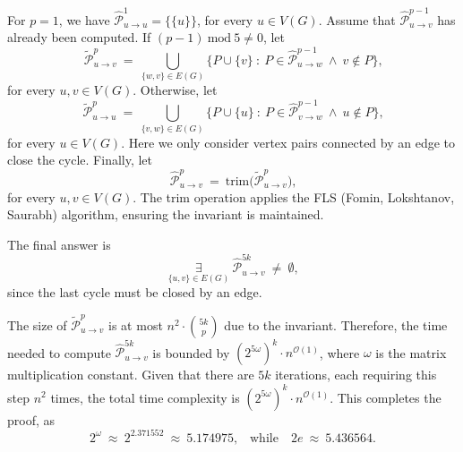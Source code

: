 \documentclass[12pt]{article}
\begin{document}
	For \(p = 1\), we have \(\widehat{\mathcal{P}}_{u \to u}^{1} = \{\{u\}\}\),
	for every \(u \in V(G)\). Assume that
	\(\widehat{\mathcal{P}}_{u \to v}^{p - 1}\) has already been computed. If
	\((p - 1) \ \text{mod} \ 5 \neq 0\), let
	\[ \widetilde{\mathcal{P}}_{u \to v}^{p} \ = \
	\bigcup\limits_{\{w, v\} \in E(G)} \Big\{ P \cup \{v\} \ : \ P \in
	\widehat{\mathcal{P}}_{u \to w}^{p - 1} \ \wedge \ v \notin P \Big\}
	\text{,} \]
	for every \(u, v \in V(G)\). Otherwise, let
	\[ \widetilde{\mathcal{P}}_{u \to u}^{p} \ = \
	\bigcup\limits_{\{v, w\} \in E(G)} \Big\{ P \cup \{u\} \ : \ P \in
	\widehat{\mathcal{P}}_{v \to w}^{p - 1} \ \wedge \ u \notin P \Big\}
	\text{,} \]
	for every \(u \in V(G)\). Here we only consider vertex pairs connected by an
	edge to close the cycle. Finally, let
	\[ \widehat{\mathcal{P}}_{u \to v}^{p} \ = \ \text{trim} \Big(
	\widetilde{\mathcal{P}}_{u \to v}^{p} \Big) \text{,} \]
	for every \(u, v \in V(G)\). The trim operation applies the FLS (Fomin,
	Lokshtanov, Saurabh) algorithm, ensuring the invariant is maintained.
	
	\medskip
	
	The final answer is
	\[ \underset{\{u, v\} \in E(G)}{\exists} \
	\widehat{\mathcal{P}}_{u \to v}^{5k} \ \neq \ \emptyset \text{,} \]
	since the last cycle must be closed by an edge.
	
	\medskip
	
	The size of \(\widetilde{\mathcal{P}}_{u \to v}^{p}\) is at most \(n^{2}
	\cdot \binom{5k}{p}\) due to the invariant. Therefore, the time needed to
	compute \(\widehat{\mathcal{P}}_{u \to v}^{5k}\) is bounded by
	\((2^{5 \omega})^{k} \cdot n^{\mathcal{O}(1)}\), where \(\omega\) is the
	matrix multiplication constant. Given that there are \(5k\) iterations, each
	requiring this step \(n^{2}\) times, the total time complexity is
	\((2^{5 \omega})^{k} \cdot n^{\mathcal{O}(1)}\). This completes the proof,
	as
	\[ 2^{\omega} \ \approx \ 2^{2.371552} \ \approx \ 5.174975 \text{,} \quad
	\text{while} \quad 2e \ \approx \ 5.436564 \text{.} \]
\end{document}
